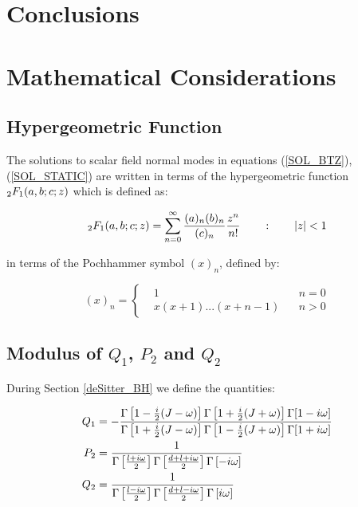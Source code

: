 \documentclass[11pt,a4paper]{article}
\begin{document}
{%
%    

\section{Conclusions}\label{label4}

%

\newpage

\appendix

\section{Mathematical Considerations}

\subsection{Hypergeometric Function}

The solutions to scalar field normal modes in equations (\ref{SOL_BTZ}), (\ref{SOL_STATIC}) are written in terms of the hypergeometric function ${}_2F_1(a,b;c;z)$ which is defined as:

\begin{equation}
    {}_2F_1(a,b;c;z) = \sum^{\infty}_{n=0} \frac{(a)_n(b)_n}{(c)_n}\frac{z^n}{n!} ~~~~~~:~~~~~~ \left| z \right| < 1
\end{equation}

{\noindent in terms of the Pochhammer symbol $(x)_n$, defined by: }

\begin{equation}
    (x)_n=\left\{
        \begin{aligned}
            &1 &n=0 \\
            &x(x+1)...(x+n-1) ~~~~ &n>0
        \end{aligned}
        \right.
\end{equation}

\subsection{Modulus of \texorpdfstring{$Q_1$}{TEXT}, \texorpdfstring{$P_2$}{TEXT} and \texorpdfstring{$Q_2$}{TEXT}}

During Section \ref{deSitter_BH} we define the quantities:

\begin{equation}
    \begin{aligned}
        Q_1 &= - \frac{\Gamma\left[1-\frac{i}{2}(J-\omega)\right]\Gamma\left[1+\frac{i}{2}(J+\omega)\right]\Gamma[1-i\omega]}{\Gamma\left[1+\frac{i}{2}(J-\omega)\right]\Gamma\left[1-\frac{i}{2}(J+\omega)\right]\Gamma[1+i\omega]}\\
        P_2 &=\frac{1}{\Gamma\left[\frac{l+i\omega}{2}\right]\Gamma\left[\frac{d+l+i\omega}{2}\right]\Gamma\left[-i\omega\right]} \\
        Q_2 &=\frac{1}{\Gamma\left[\frac{l-i\omega}{2}\right]\Gamma\left[\frac{d+l-i\omega}{2}\right]\Gamma\left[i\omega\right]} 
    \end{aligned}
\end{equation}

}
\end{document}
